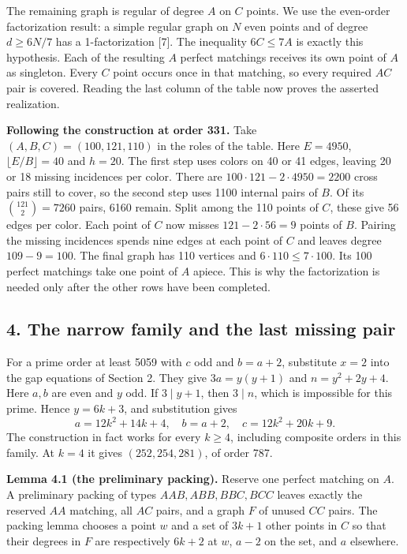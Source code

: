 \documentclass[english,11pt,a4paper]{article}
\begin{document}
The remaining graph is regular of degree \(A\) on \(C\) points. We use the even-order factorization result: a simple regular graph on \(N\) even points and of degree \(d\ge6N/7\) has a 1-factorization {[}7{]}. The inequality \(6C\le7A\) is exactly this hypothesis. Each of the resulting \(A\) perfect matchings receives its own point of \(A\) as singleton. Every \(C\) point occurs once in that matching, so every required \(AC\) pair is covered. Reading the last column of the table now proves the asserted realization.

\textbf{Following the construction at order 331.} Take \((A,B,C)=(100,121,110)\) in the roles of the table. Here \(E=4950\), \(\lfloor E/B\rfloor=40\) and \(h=20\). The first step uses colors on 40 or 41 edges, leaving 20 or 18 missing incidences per color. There are \(100\cdot121-2\cdot4950=2200\) cross pairs still to cover, so the second step uses 1100 internal pairs of \(B\). Of its \(\binom{121}{2}=7260\) pairs, 6160 remain. Split among the 110 points of \(C\), these give 56 edges per color. Each point of \(C\) now misses \(121-2\cdot56=9\) points of \(B\). Pairing the missing incidences spends nine edges at each point of \(C\) and leaves degree \(109-9=100\). The final graph has 110 vertices and \(6\cdot110\le7\cdot100\). Its 100 perfect matchings take one point of \(A\) apiece. This is why the factorization is needed only after the other rows have been completed.

\subsection{4. The narrow family and the last missing pair}\label{the-narrow-family-and-the-last-missing-pair}

For a prime order at least 5059 with \(c\) odd and \(b=a+2\), substitute \(x=2\) into the gap equations of Section 2. They give \(3a=y(y+1)\) and \(n=y^2+2y+4\). Here \(a,b\) are even and \(y\) odd. If \(3\mid y+1\), then \(3\mid n\), which is impossible for this prime. Hence \(y=6k+3\), and substitution gives \[a=12k^2+14k+4,\quad b=a+2,\quad c=12k^2+20k+9.\] The construction in fact works for every \(k\ge4\), including composite orders in this family. At \(k=4\) it gives \((252,254,281)\), of order 787.

\textbf{Lemma 4.1 (the preliminary packing).} Reserve one perfect matching on \(A\). A preliminary packing of types \(AAB,ABB,BBC,BCC\) leaves exactly the reserved \(AA\) matching, all \(AC\) pairs, and a graph \(F\) of unused \(CC\) pairs. The packing lemma chooses a point \(w\) and a set of \(3k+1\) other points in \(C\) so that their degrees in \(F\) are respectively \(6k+2\) at \(w\), \(a-2\) on the set, and \(a\) elsewhere.
\end{document}
